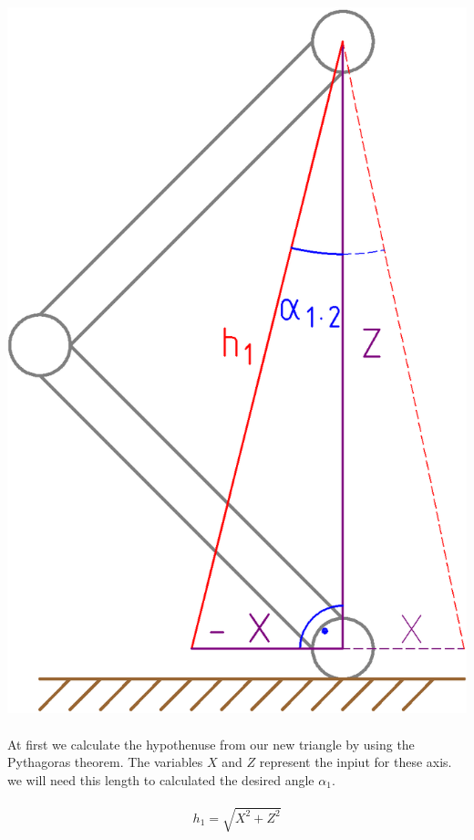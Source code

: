 \documentclass{article}
\begin{document}
    \paragraph{}
    \includegraphics[scale=0.2]{x-axis}

    \paragraph{}
    At first we calculate the hypothenuse from our new triangle by using the Pythagoras theorem. The variables $X$ and $Z$ represent the inpiut for these axis. we will need this length to calculated the desired angle $\alpha_1$.

    \paragraph{}
    \begin{equation}
        h_1 = \sqrt{X^2 + Z^2}
    \end{equation}
\end{document}
